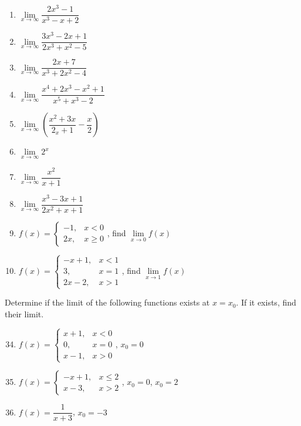 \documentclass[12pt]{report}
\begin{document}
\begin{multicols}{2}
\begin{enumerate}
    \item $\lim\limits_{x\to\infty}{\dfrac{2x^{3}-1}{x^{3}-x+2}}$
    \item $\lim\limits_{x\to\infty}{\dfrac{3x^{3}-2x+1}{2x^{3}+x^{2}-5}}$
    \item $\lim\limits_{x\to\infty}{\dfrac{2x+7}{x^{3}+2x^{2}-4}}$
    \item $\lim\limits_{x\to\infty}{\dfrac{x^{4}+2x^{3}-x^{2}+1}{x^{5}+x^{3}-2}}$
    \item $\lim\limits_{x\to\infty}\left({\dfrac{x^{2}+3x}{2_x+1}}-{\dfrac{x}{2}}\right)$
    \item $\lim\limits_{x\to\infty}2^{x}$
    \item $\lim\limits_{x\to\infty}{\dfrac{x^{2}}{x+1}}$
    \item $\lim\limits_{x\to\infty}{\dfrac{x^{3}-3x+1}{2x^{2}+x+1}}$
    \item $f (x) = \left\{\begin{array}{rl}
              -1, & x < 0    \\
              2x, & x \geq 0
            \end{array}\right.$, find $\lim\limits_{x\to0}f (x)$
    \item $f (x) = \left\{\begin{array}{rl}
              -x+1,   & x < 1 \\
              3,      & x = 1 \\
              2x - 2, & x > 1
            \end{array}\right.$, find $\lim\limits_{x\to1}f (x)$
  \end{enumerate}
  Determine if the limit of the following functions exists at $x = x_0$. If it
  exists, find their limit.
  \begin{enumerate}
    \setcounter{enumi}{33}
    \item $f (x) = \left\{\begin{array}{rl}
              x+1, & x < 0 \\
              0,   & x = 0 \\
              x-1, & x > 0
            \end{array}\right.$, $x_0 = 0$

    \item $f (x) = \left\{\begin{array}{rl}
              -x + 1, & x \leq 2 \\
              x - 3,  & x > 2
            \end{array}\right.$, $x_0 = 0$, $x_0 = 2$

    \item $f (x) = \dfrac{1}{x+3}$, $x_0 = -3$
  \end{enumerate}
\end{multicols}
\end{document}
